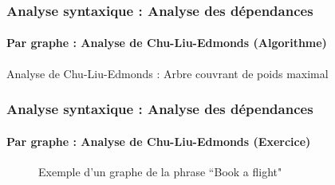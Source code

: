 \documentclass[xcolor=table]{beamer}
\begin{document}
\begin{frame}
\frametitle{Analyse syntaxique : Analyse des dépendances}
\framesubtitle{Par graphe : Analyse de Chu-Liu-Edmonds (Algorithme)}

\vspace{-3pt}
\begin{block}{Analyse de Chu-Liu-Edmonds : Arbre couvrant de poids maximal}
	\scriptsize\vspace{-6pt}
	\begin{algorithm}[H]
		
		
		\vspace{-3pt}
	\end{algorithm}\vspace{-3pt}
\end{block}

\end{frame}

\begin{frame}
\frametitle{Analyse syntaxique : Analyse des dépendances}
\framesubtitle{Par graphe : Analyse de Chu-Liu-Edmonds (Exercice)}

\begin{figure}
	\centering
	\caption{Exemple d'un graphe de la phrase ``Book a flight" \cite{2019-jurafsky-martin}}
\end{figure}

\end{frame}

\end{document}
